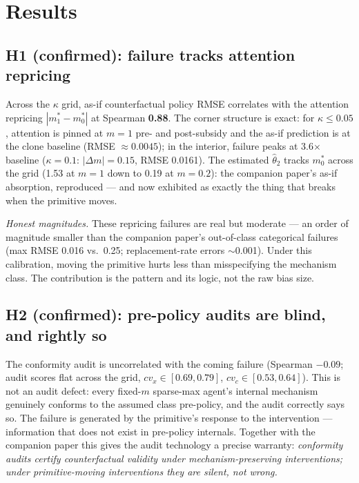 \documentclass[11pt]{article}
\newcommand{\that}[1]{\widehat{\theta}_{#1}}
\newcommand{\mstar}{m^{*}}
\begin{document}
\section{Results}\label{sec:results}

\subsection{H1 (confirmed): failure tracks attention repricing}
Across the $\kappa$ grid, as-if counterfactual policy RMSE correlates with
the attention repricing $|\mstar_1 - \mstar_0|$ at Spearman
\textbf{0.88}. The corner structure is exact: for $\kappa \le 0.05$,
attention is pinned at $m = 1$ pre- and post-subsidy and the as-if
prediction is at the clone baseline (RMSE $\approx 0.0045$); in the
interior, failure peaks at 3.6$\times$ baseline ($\kappa = 0.1$:
$|\Delta m| = 0.15$, RMSE 0.0161). The estimated $\that{2}$ tracks
$\mstar_0$ across the grid (1.53 at $m = 1$ down to 0.19 at $m = 0.2$):
the companion paper's as-if absorption, reproduced --- and now exhibited as
exactly the thing that breaks when the primitive moves.

\emph{Honest magnitudes.} These repricing failures are real but moderate
--- an order of magnitude smaller than the companion paper's out-of-class
categorical failures (max RMSE 0.016 vs.\ 0.25; replacement-rate errors
$\sim$0.001). Under this calibration, moving the primitive hurts less than
misspecifying the mechanism class. The contribution is the pattern and its
logic, not the raw bias size.

\subsection{H2 (confirmed): pre-policy audits are blind, and rightly so}
The conformity audit is uncorrelated with the coming failure (Spearman
$\mathbf{-0.09}$; audit scores flat across the grid, $cv_x \in
[0.69, 0.79]$, $cv_c \in [0.53, 0.64]$). This is not an audit defect: every
fixed-$m$ sparse-max agent's internal mechanism genuinely conforms to the
assumed class pre-policy, and the audit correctly says so. The failure is
generated by the primitive's response to the intervention --- information
that does not exist in pre-policy internals. Together with the companion
paper this gives the audit technology a precise warranty: \emph{conformity
audits certify counterfactual validity under mechanism-preserving
interventions; under primitive-moving interventions they are silent, not
wrong.}
\end{document}
